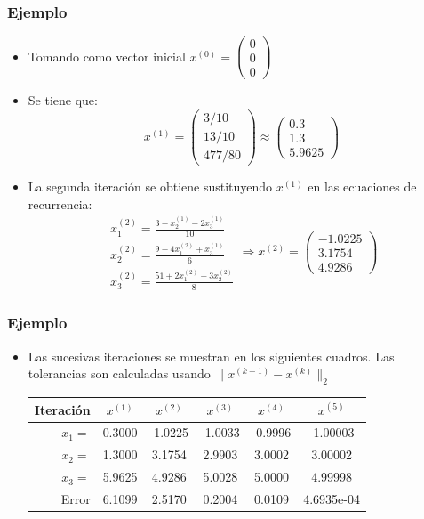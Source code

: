 \documentclass[10pt]{beamer}
\begin{document}
  \begin{frame}
    \frametitle{Ejemplo}
    \begin{itemize}
      \item Tomando como vector inicial $x^{(0)} = \left(\begin{array}{c}
      0\\
      0\\
      0
      \end{array}\right)$
      \item<2-> Se tiene que:
      $$
      x^{(1)} = \left(\begin{array}{c}
        3/10\\
        13/10\\
        477/80
        \end{array}\right)\approx
      \left(\begin{array}{c}
      0.3\\
      1.3\\
      5.9625
      \end{array}\right)
      $$
      \item<3-> La segunda iteraci\'on se obtiene sustituyendo $x^{(1)}$ en las ecuaciones de recurrencia:
      $$
      \begin{array}{c}
        x_1^{(2)} = \displaystyle\frac{3-x_2^{(1)}-2x_3^{(1)}}{10}\\[5pt]
        x_2^{(2)} = \displaystyle\frac{9-4x_1^{(2)}+x_3^{(1)}}{6}\\[5pt]
        x_3^{(2)} = \displaystyle\frac{51+2x_1^{(2)}-3x_2^{(2)}}{8}
      \end{array} \Rightarrow x^{(2)} = \left(\begin{array}{c}
        -1.0225\\
        3.1754\\
        4.9286
      \end{array}\right)
      $$
    \end{itemize}
  \end{frame}
  \begin{frame}
    \frametitle{Ejemplo}
    \begin{itemize}
      \item<1-> Las sucesivas iteraciones se muestran en los siguientes cuadros. Las tolerancias son calculadas usando $\|x^{(k+1)}-x^{(k)}\|_2$
      \newline
      \begin{center}
        \begin{tabular}{rccccc}\hline
          Iteraci\'on & $x^{(1)}$ & $x^{(2)}$ & $x^{(3)}$ & $x^{(4)}$ & $x^{(5)}$\\\hline  
          $x_1 = $ &  0.3000 & -1.0225 & -1.0033 & -0.9996  & -1.00003 \\
          $x_2 = $ & 1.3000 & 3.1754  & 2.9903  & 3.0002 & 3.00002 \\
          $x_3 = $ & 5.9625 & 4.9286 & 5.0028 & 5.0000 & 4.99998\\
          Error & 6.1099 & 2.5170 & 0.2004 & 0.0109 & 4.6935e-04
        \end{tabular}
      \end{center}
    \end{itemize}
  \end{frame}
\end{document}
